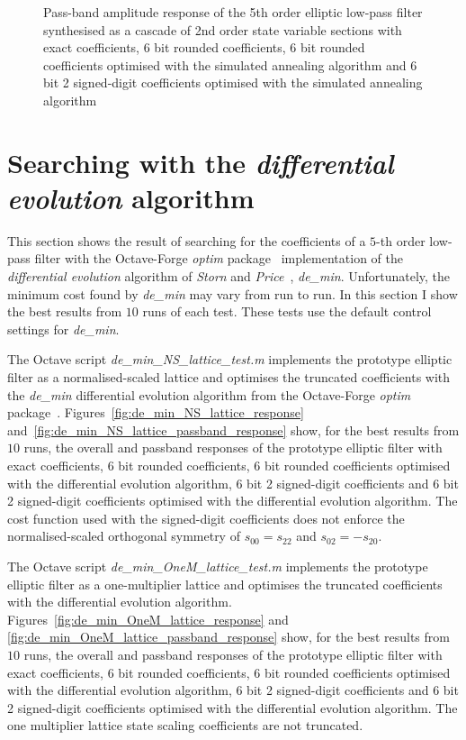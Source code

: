 \documentclass[a4paper,twoside,10pt,english]{report}
\begin{document}
\begin{figure}[!htbp]
\begin{center}
\scalebox{0.7}{}
\caption{Pass-band amplitude response of the 5th order elliptic low-pass
filter synthesised as a cascade of 2nd order state variable sections with
exact coefficients, 6 bit rounded coefficients, 6 bit rounded coefficients 
optimised with the simulated annealing algorithm
and 6 bit 2 signed-digit coefficients optimised with the simulated
annealing algorithm}
\label{fig:samin_svcasc_passband_response}
\end{center}
\end{figure}
\clearpage{}
\section{Searching with the \emph{differential evolution} algorithm}
This section shows the result of searching for the coefficients of a $5$-th
order low-pass filter with the Octave-Forge \emph{optim} 
package~\cite{OctaveForge_OptimPackage} implementation of the 
\emph{differential evolution} algorithm of \emph{Storn} and 
\emph{Price}~\cite{StornPrice_DifferentialEvolution}, \emph{de\_min}. 
Unfortunately, the minimum cost found by \emph{de\_min} may vary from run to
run. In this section I show the best results from $10$ runs of each test. These
tests use the default control settings for \emph{de\_min}.

The Octave script \emph{de\_min\_NS\_lattice\_test.m} implements the prototype
elliptic filter as a normalised-scaled lattice and optimises the truncated
coefficients with the \emph{de\_min} differential evolution algorithm from the
Octave-Forge \emph{optim} package~\cite{OctaveForge_OptimPackage}.
Figures~\ref{fig:de_min_NS_lattice_response} 
and~\ref{fig:de_min_NS_lattice_passband_response} show, for the best results 
from $10$ runs, the overall and passband responses of the prototype elliptic 
filter with exact coefficients, 6 bit rounded coefficients, 6 bit rounded 
coefficients optimised with the differential evolution algorithm, 6 bit 2 
signed-digit coefficients and 6 bit 2 signed-digit coefficients optimised with 
the differential evolution algorithm. The cost function used with the 
signed-digit coefficients does not enforce the normalised-scaled orthogonal 
symmetry of $s_{00}=s_{22}$ and $s_{02}=-s_{20}$.

The Octave script \emph{de\_min\_OneM\_lattice\_test.m} implements the prototype
elliptic filter as a one-multiplier lattice and optimises the truncated
coefficients with the differential evolution algorithm. 
Figures~\ref{fig:de_min_OneM_lattice_response} and
\ref{fig:de_min_OneM_lattice_passband_response} show, for the best results from
$10$ runs, the overall and passband responses of the prototype elliptic filter 
with exact coefficients, 6 bit rounded coefficients, 6 bit rounded coefficients 
optimised with the differential evolution algorithm, 6 bit 2 signed-digit 
coefficients and 6 bit 2 signed-digit coefficients optimised with the 
differential evolution algorithm. The one multiplier lattice state scaling 
coefficients are not truncated.
\end{document}
